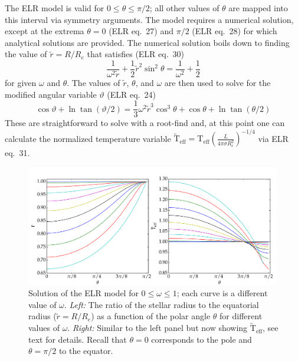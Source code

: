 \documentclass[12pt]{article}
\newcommand{\Teff}{\mathrm{T_{eff}}}
\newcommand{\twTeff}{\mathrm{\tilde{T}_{eff}}}
\begin{document}
The ELR model is valid for $0 \leq \theta \leq \pi/2$; all other values of
$\theta$ are mapped into this interval via symmetry arguments. The model
requires a numerical solution, except at the extrema $\theta = 0$ (ELR eq.\ 27)
and $\pi/2$ (ELR eq.\ 28) for which analytical solutions are provided. The
numerical solution boils down to finding the value of $\tilde{r}=R/R_e$ that
satisfies (ELR eq.\ 30)
\begin{equation}
  \frac{1}{\omega^2 \tilde{r}} + \frac{1}{2} \tilde{r}^2 \sin^2 \theta = \frac{1}{\omega^2} + \frac{1}{2}
\end{equation}
for given $\omega$ and $\theta$. The values of $\tilde{r}$, $\theta$, and $\omega$ are then used to solve for the modified angular variable $\vartheta$ (ELR eq.\ 24)
\begin{equation}
  \cos \vartheta + \ln \tan(\vartheta/2) = \frac{1}{3} \omega^2 \tilde{r}^3 \cos^3 \theta + \cos \theta + \ln \tan(\theta/2)
\end{equation}
These are straightforward to solve with a root-find and, at this point one can calculate the normalized temperature variable
\begin{math}
  \twTeff = \Teff \left( \frac{L}{4 \pi \sigma R_e^2} \right)^{-1/4}
\end{math} via ELR eq.\ 31.

\begin{figure}
  \centering
  \includegraphics[width=0.99\textwidth]{../plots/R_and_T.pdf}
  \caption{Solution of the ELR model for $0 \leq \omega \leq 1$; each curve is a different value of $\omega$. \emph{Left:} The ratio of the stellar radius to the equatorial radius ($\tilde{r}=R/R_e$) as a function of the polar angle $\theta$ for different values of $\omega$. \emph{Right:} Similar to the left panel but now showing $\twTeff$, see text for details. Recall that $\theta=0$ corresponds to the pole and $\theta=\pi/2$ to the equator.\label{fig:ELR}}
\end{figure}
\end{document}
